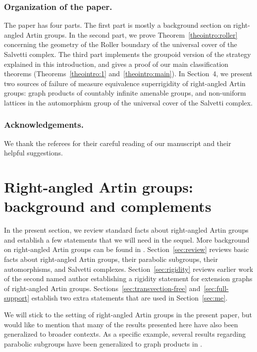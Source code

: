 \subsubsection*{Organization of the paper.}

The paper has four parts. The first part is mostly a background section on right-angled Artin groups. In the second part, we prove Theorem~\ref{theointro:roller} concerning the geometry of the Roller boundary of the universal cover of the Salvetti complex. The third part implements the groupoid version of the strategy explained in this introduction, and gives a proof of our main classification theorems (Theorems~\ref{theointro:1} and~\ref{theointro:main}). In Section~4, we present two sources of failure of measure equivalence superrigidity of right-angled Artin groups: graph products of countably infinite amenable groups, and non-uniform lattices in the automorphism group of the universal cover of the Salvetti complex.

\subsubsection*{Acknowledgements.}
We thank the referees for their careful reading of our manuscript and their helpful suggestions.

\section{Right-angled Artin groups: background and complements}

In the present section, we review standard facts about right-angled Artin groups and establish a few statements that we will need in the sequel. More background on right-angled Artin groups can be found in \cite{charney2007introduction}. Section~\ref{sec:review} reviews basic facts about right-angled Artin groups, their parabolic subgroups, their automorphisms, and Salvetti complexes. Section~\ref{sec:rigidity} reviews earlier work of the second named author \cite{Hua} establishing a rigidity statement for extension graphs of right-angled Artin groups. Sections~\ref{sec:transvection-free} and~\ref{sec:full-support} establish two extra statements that are used in Section~\ref{sec:me}.

We will stick to the setting of right-angled Artin groups in the present paper, but would like to mention that many of the results presented here have also been generalized to broader contexts. As a specific example, several results regarding parabolic subgroups have been generalized to graph products in \cite[\S 3]{antolin2015tits}.

